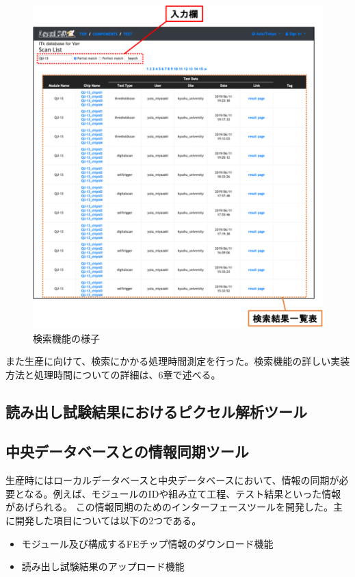 \begin{figure}[bpt]\centering
\includegraphics[width=12cm]{webapp_search_function}
\caption[検索機能の様子]{検索機能の様子}
\label{webapp_search_function}
\end{figure}

また生産に向けて、検索にかかる処理時間測定を行った。検索機能の詳しい実装方法と処理時間についての詳細は、6章で述べる。

\subsection{読み出し試験結果におけるピクセル解析ツール}

\newpage
\subsection{中央データベースとの情報同期ツール}
生産時にはローカルデータベースと中央データベースにおいて、情報の同期が必要となる。例えば、モジュールのIDや組み立て工程、テスト結果といった情報があげられる。
この情報同期のためのインターフェースツールを開発した。主に開発した項目については以下の2つである。

\begin{itemize}
  \item モジュール及び構成するFEチップ情報のダウンロード機能
  \item 読み出し試験結果のアップロード機能
\end{itemize}

